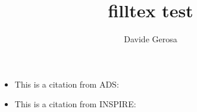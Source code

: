 \documentclass[]{article}
\begin{document}
\title{filltex test}

\author{Davide Gerosa}

\maketitle


\begin{itemize}
\item This is a citation from ADS: \cite{2016PhRvL.116f1102A}
\item This is a citation from INSPIRE: \cite{Abbott:2016blz}
\end{itemize}



\end{document}
